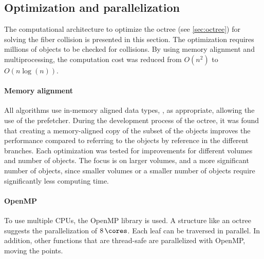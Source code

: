 \subsection{Optimization and parallelization}\label{sec:modelOpt}
%
The computational architecture to optimize the octree (see \cref{sec:octree}) for solving the fiber collision is presented in this section.
The optimization requires millions of objects to be checked for collisions.
By using memory alignment and multiprocessing, the computation cost was reduced from $O(n^2)$ to $O(n\log(n))$.
%
%
\paragraph{Memory alignment}
All algorithms use in-memory aligned data types, \eg{} , as appropriate, allowing the use of the  prefetcher.
During the development process of the octree, it was found that creating a memory-aligned copy of the subset of the objects improves the performance compared to referring to the objects by reference in the different branches.
Each optimization was tested for improvements for different volumes and number of objects.
The focus is on larger volumes, and a more significant number of objects, since smaller volumes or a smaller number of objects require significantly less computing time.
%
%
\paragraph{OpenMP}
To use multiple \acp{CPU}, the \ac{OpenMP} library is used.
A structure like an octree suggests the parallelization of $\SI{8}{\cores}$.
Each leaf can be traversed in parallel.
In addition, other functions that are thread-safe are parallelized with \ac{OpenMP}, \eg{} moving the points.
%
%
%
